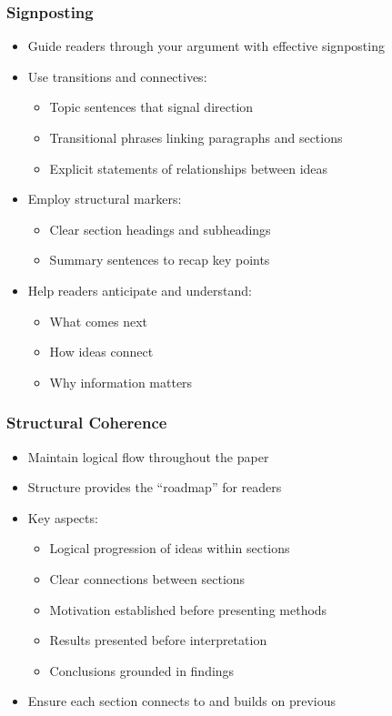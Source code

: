 \documentclass{beamer}
\begin{document}
\begin{frame}
  \frametitle{Signposting}
  \begin{itemize}
    \item Guide readers through your argument with effective signposting
    \item Use transitions and connectives:
    \begin{itemize}
      \item Topic sentences that signal direction
      \item Transitional phrases linking paragraphs and sections
      \item Explicit statements of relationships between ideas
    \end{itemize}
    \item Employ structural markers:
    \begin{itemize}
      \item Clear section headings and subheadings
      \item Summary sentences to recap key points
    \end{itemize}
    \item Help readers anticipate and understand:
    \begin{itemize}
      \item What comes next
      \item How ideas connect
      \item Why information matters
    \end{itemize}
  \end{itemize}
\end{frame}

\begin{frame}
  \frametitle{Structural Coherence}
  \begin{itemize}
    \item Maintain logical flow throughout the paper
    \item Structure provides the ``roadmap'' for readers
    \item Key aspects:
    \begin{itemize}
      \item Logical progression of ideas within sections
      \item Clear connections between sections
      \item Motivation established before presenting methods
      \item Results presented before interpretation
      \item Conclusions grounded in findings
    \end{itemize}
    \item Ensure each section connects to and builds on previous
  \end{itemize}
\end{frame}
\end{document}
